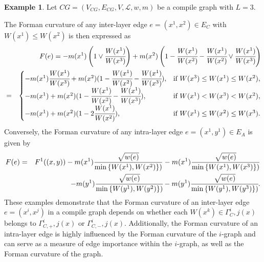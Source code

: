 \documentclass[preprint,12pt,number]{elsarticle}
\theoremstyle{plain} %
\theoremstyle{definition} %
\newtheorem{example}[theorem]{\indent\sc Example}
\begin{document}
\begin{example}
    Let $CG = (V_{CG}, E_{CG}, V, \mathcal{L}, w, m)$ be a compile graph with $L=3$. 
\end{example}
    The Forman curvature of any inter-layer edge $e =(x^1, x^2) \in E_C$ with $W(x^1) \leq W(x^2)$ is then expressed as 
    \begin{eqnarray*}
        &\ &F(e)= -m(x^1) \left(1 \vee \cfrac{W(x^1)}{W(x^3)} \right) + m(x^2)\left(1 - \cfrac{W(x^1)}{W(x^2)} - \cfrac{W(x^1)}{W(x^2)}\vee \cfrac{W(x^1)}{W(x^3)} \right)\\
        &=& 
        \begin{cases}
            -m(x^1) \cfrac{W(x^1)}{W(x^3)} + m(x^2)(1 - \cfrac{W(x^1)}{W(x^2)} - \cfrac{W(x^1)}{W(x^3)}),& \text{if}\ W(x^3) \leq W(x^1)\leq W(x^2),\\
            -m(x^1) + m(x^2)(1 - \cfrac{W(x^1)}{W(x^2)} - \cfrac{W(x^1)}{W(x^3)}),& \text{if}\ W(x^1)<W(x^3)<W(x^2),\\
            -m(x^1) + m(x^2)(1 - 2\cfrac{W(x^1)}{W(x^2)}),& \text{if}\ W(x^1) \leq W(x^2) \leq W(x^3).
        \end{cases}
\end{eqnarray*}
Conversely, the Forman curvature of any intra-layer edge $e = (x^1, y^1) \in E_A$ is given by
    \begin{eqnarray*}
        F(e) &=& F^1((x,y)) - m(x^1)\frac{\sqrt{w(e)}}{\min \left\{W(x^1), W(x^2) \right\})} - m(x^1)\frac{\sqrt{w(e)}}{\min \left\{W(x^1), W(x^3) \right\})}\\
        &\ & - m(y^1)\cfrac{\sqrt{w(e)}}{\min \left\{W(y^1), W(y^2) \right\})}- m(y^1)\cfrac{\sqrt{w(e)}}{\min \left\{W(y^1), W(y^3) \right\})}.
    \end{eqnarray*}
These examples demonstrate that the Forman curvature of an inter-layer edge $e=(x^i, x^j)$ in a compile graph depends on whether each $W(x^k)\in \Gamma_C^i,j(x)$ belongs to $\Gamma_{C,+}^i,j(x)$ or $\Gamma_{C,-}^i,j(x)$. Additionally, the Forman curvature of an intra-layer edge is highly influenced by the Forman curvature of the $i$-graph and can serve as a measure of edge importance within the $i$-graph, as well as the Forman curvature of the graph.
\end{document}
